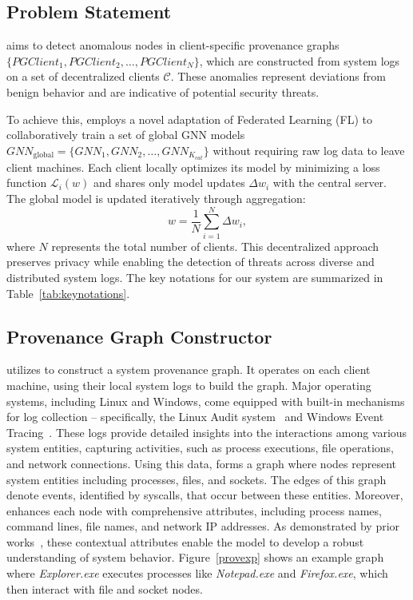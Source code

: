\subsection{Problem Statement}

\Sys aims to detect anomalous nodes in client-specific provenance graphs \( \{PGClient_{1}, PGClient_{2}, \ldots, PGClient_{N}\} \), which are constructed from system logs on a set of decentralized clients \( \mathcal{C} \). These anomalies represent deviations from benign behavior and are indicative of potential security threats.

To achieve this, \Sys employs a novel adaptation of Federated Learning (FL) to collaboratively train a set of global GNN models \( {GNN}_{\text{global}} = \{GNN_1, GNN_2, \ldots, GNN_{K_{cat}}\} \) without requiring raw log data to leave client machines. Each client locally optimizes its model by minimizing a loss function \( \mathcal{L}_i(w) \) and shares only model updates \( \Delta w_i \) with the central server. The global model is updated iteratively through aggregation:
\[
w = \frac{1}{N} \sum_{i=1}^{N} \Delta w_i,
\]
where \( N \) represents the total number of clients. This decentralized approach preserves privacy while enabling the detection of threats across diverse and distributed system logs. The key notations for our system are summarized in Table~\ref{tab:keynotations}.



\subsection{Provenance Graph Constructor}
\label{sub:provconstruct}

\Sys utilizes \logs to construct a system provenance graph. It operates on each client machine, using their local system logs to build the graph. Major operating systems, including Linux and Windows, come equipped with built-in mechanisms for log collection -- specifically, the Linux Audit system~\cite{linuxaudit} and Windows Event Tracing~\cite{windowsaudit}. These logs provide detailed insights into the interactions among various system entities, capturing activities, such as process executions, file operations, and network connections. Using this data, \Sys forms a graph where nodes represent system entities including processes, files, and sockets. The edges of this graph denote events, identified by syscalls, that occur between these entities. Moreover, \Sys enhances each node with comprehensive attributes, including process names, command lines, file names, and network IP addresses. As demonstrated by prior works~\cite{flash2024,cheng2023kairos}, these contextual attributes enable the model to develop a robust understanding of system behavior. Figure~\ref{provexp} shows an example graph where \textit{Explorer.exe} executes processes like \textit{Notepad.exe} and \textit{Firefox.exe}, which then interact with file and socket nodes.

